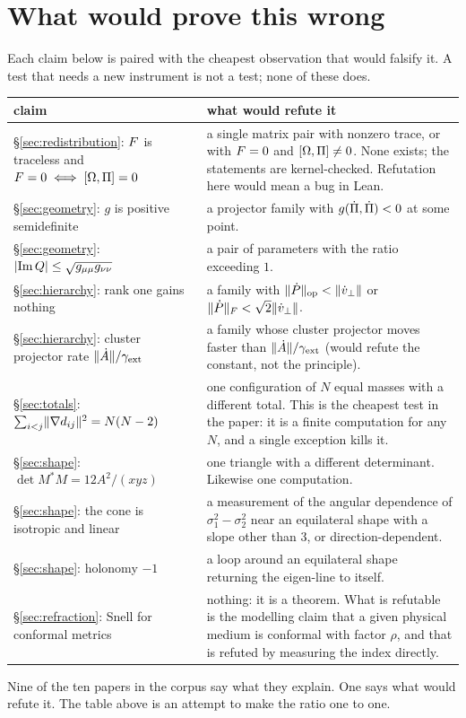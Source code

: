 \section{What would prove this wrong}\label{sec:refute}

Each claim below is paired with the cheapest observation that would falsify it. A test that needs
a new instrument is not a test; none of these does.

\begin{center}
\begin{tabular}{@{}p{}p{}@{}}
\toprule
claim & what would refute it \\
\midrule
\S\ref{sec:redistribution}: $F$ is traceless and $F=0\iff[\Omega,\Pi]=0$ &
a single matrix pair with nonzero trace, or with $F=0$ and $[\Omega,\Pi]\neq0$. None exists;
the statements are kernel-checked. Refutation here would mean a bug in Lean. \\
\S\ref{sec:geometry}: $g$ is positive semidefinite &
a projector family with $g(\dot{\Pi},\dot{\Pi})<0$ at some point. \\
\S\ref{sec:geometry}: $\lvert\operatorname{Im}Q\rvert\le\sqrt{g_{\mu\mu}g_{\nu\nu}}$ &
a pair of parameters with the ratio exceeding $1$. \\
\S\ref{sec:hierarchy}: rank one gains nothing &
a family with $\lVert\dot P\rVert_{\mathrm{op}}<\lVert\dot v_\perp\rVert$ or
$\lVert\dot P\rVert_F<\sqrt2\lVert\dot v_\perp\rVert$. \\
\S\ref{sec:hierarchy}: cluster projector rate $\lVert\dot A\rVert/\gamma_{\mathrm{ext}}$ &
a family whose cluster projector moves faster than $\lVert\dot A\rVert/\gamma_{\mathrm{ext}}$ (would
refute the constant, not the principle). \\
\S\ref{sec:totals}: $\sum_{i<j}\lVert\nabla d_{ij}\rVert^2=N(N-2)$ &
one configuration of $N$ equal masses with a different total. This is the cheapest test in the
paper: it is a finite computation for any $N$, and a single exception kills it. \\
\S\ref{sec:shape}: $\det M^*M=12A^2/(xyz)$ &
one triangle with a different determinant. Likewise one computation. \\
\S\ref{sec:shape}: the cone is isotropic and linear &
a measurement of the angular dependence of $\sigma_1^2-\sigma_2^2$ near an equilateral shape with
a slope other than $3$, or direction-dependent. \\
\S\ref{sec:shape}: holonomy $-1$ &
a loop around an equilateral shape returning the eigen-line to itself. \\
\S\ref{sec:refraction}: Snell for conformal metrics &
nothing: it is a theorem. What is refutable is the modelling claim that a given physical medium
is conformal with factor $\rho$, and that is refuted by measuring the index directly. \\
\bottomrule
\end{tabular}
\end{center}

\begin{remark}
Nine of the ten papers in the corpus say what they explain. One says what would refute it. The
table above is an attempt to make the ratio one to one.
\end{remark}
